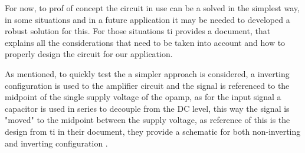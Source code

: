 For now, to prof of concept the circuit in use can be a solved in the simplest way, in some situations and in a future application it may be needed to developed a robust solution for this. For those situations \acrshort{ti} provides a document, that explains all the considerations that need to be taken into account and how to properly design the circuit for our application\cite{manciniSingleSupplyOpAmp}.

As mentioned, to quickly test the a simpler approach is considered, a inverting configuration is used to the amplifier circuit and the signal is referenced to the midpoint of the single supply voltage of the \acrshort{opamp}, as for the input signal a capacitor is used in series to decouple from the DC level, this way the signal is "moved" to the midpoint between the supply voltage, as reference of this is the design from \acrshort{ti} in their document, they provide a schematic for both non-inverting and inverting configuration \cite{ACCoupledSingle2015}.

